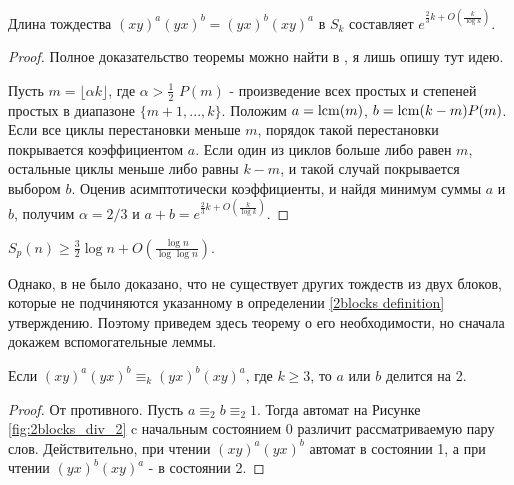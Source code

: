 \begin{theorem}
	Длина тождества $(xy)^a(yx)^b = (yx)^b(xy)^a$ в $S_k$ составляет $e^{\frac{2}{3}k + O(\frac{k}{\log k})}$.
\end{theorem}
\begin{proof}
	Полное доказательство теоремы можно найти в \cite{lower bounds}, я лишь опишу тут идею.
	
	Пусть $m = \lfloor \alpha k \rfloor$, где $\alpha > \frac{1}{2}$ $P(m)$ - произведение всех простых и степеней простых в диапазоне $\{m+1, ..., k\}$. Положим $a = \operatorname{lcm}(m)$, $b = \operatorname{lcm}(k-m) P(m)$. Если все циклы перестановки меньше $m$, порядок такой перестановки покрывается коэффициентом $a$. Если один из циклов больше либо равен $m$, остальные циклы меньше либо равны $k-m$, и такой случай покрывается выбором $b$. Оценив асимптотически коэффициенты, и найдя минимум суммы $a$ и $b$, получим $\alpha = 2/3$ и $a+b = e^{\frac{2}{3}k + O(\frac{k}{\log k})}$.
\end{proof}
\begin{corollary}
	$S_p(n) \ge \frac{3}{2} \log n + O (\frac{\log n}{\log \log n})$.
\end{corollary}
 
 Однако, в \cite{lower bounds} не было доказано, что не существует других тождеств из двух блоков, которые не подчиняются указанному в определении \ref{2blocks definition} утверждению. Поэтому приведем здесь теорему о его необходимости, но сначала докажем вспомогательные леммы.
 
 \begin{lemma} \label{2blocks div 2}
 	Если $(xy)^a(yx)^b \equiv_k (yx)^b(xy)^a$, где $k \ge 3$, то $a$ или $b$ делится на 2.
 \end{lemma}
\begin{proof}
	От противного. Пусть $a \equiv_2 b \equiv_2 1$. Тогда автомат на Рисунке \ref{fig:2blocks_div_2} c начальным состоянием 0 различит рассматриваемую пару слов.
	Действительно, при чтении $(xy)^a(yx)^b$ автомат в состоянии 1, а при чтении $(yx)^b(xy)^a$ - в состоянии 2.
\end{proof}
 
